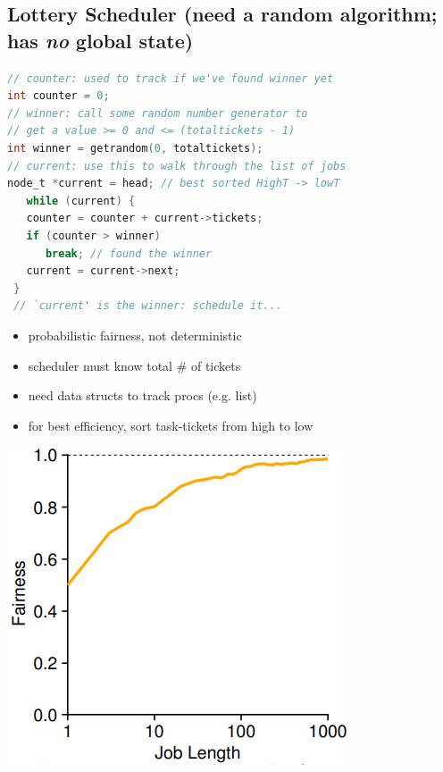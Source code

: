 \documentclass[8pt,a4paper,landscape]{extarticle}
\begin{document}
\begin{multicols*}{3}
\section*{Lottery Scheduler (need a random algorithm; has \emph{no} global state)}
\begin{minipage}{.75\linewidth}
\begin{lstlisting}[language=c]
// counter: used to track if we've found winner yet
int counter = 0;
// winner: call some random number generator to
// get a value >= 0 and <= (totaltickets - 1)
int winner = getrandom(0, totaltickets);
// current: use this to walk through the list of jobs
node_t *current = head; // best sorted HighT -> lowT
   while (current) {
   counter = counter + current->tickets;
   if (counter > winner)
      break; // found the winner
   current = current->next;
 }
 // `current' is the winner: schedule it...
\end{lstlisting}
\end{minipage}
\begin{minipage}{.25\linewidth}
  \flushleft
  \begin{itemize}
  \item probabilistic fairness, not deterministic
  \item scheduler must know total \# of tickets
  \item need data structs to track procs (e.g. list)
  \item for best efficiency, sort task-tickets from high to low
  \end{itemize}
\end{minipage}
\begin{minipage}{.45\linewidth}
  \includegraphics[width=\linewidth]{imgs/sched_lot_fair}

\end{minipage}
\end{multicols*}
\end{document}
